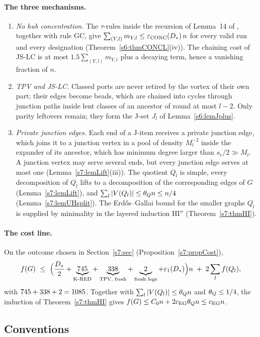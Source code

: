 \paragraph{The three mechanisms.}
\begin{enumerate}
\item[(a)] \emph{No hub concentration.} The $\tau$-rules inside the recursion of
Lemma~14 of \cite{BM}, together with rule GC, give
$\sum_{(Y,l)}m_{Y,l}\le\varepsilon_{\mathrm{CONC}}(D_{*})\,n$ for every valid run and every
designation (Theorem~\ref{s6:thmCONCL}(iv)). The chaining cost of JS-LC is at
most $1.5\sum_{(Y,l)}m_{Y,l}$ plus a decaying term, hence a vanishing fraction
of $n$.
\item[(b)] \emph{TPV and JS-LC.} Classed ports are never retired by the vortex
of their own part; their edges become beads, which are chained into cycles
through junction paths inside lent classes of an ancestor of round at most
$l-2$. Only parity leftovers remain; they form the J-set $J_l$ of
Lemma~\ref{s6:lemJplus}.
\item[(c)] \emph{Private junction edges.} Each end of a J-item receives a
private junction edge, which joins it to a junction vertex in a pool of density
$M_l^{-2}$ inside the expander of its ancestor, which has minimum degree larger
than $s_r/2\gg M_l$. A junction vertex may serve several ends, but every
junction edge serves at most one (Lemma~\ref{s7:lemLift}(iii)). The quotient
$Q_l$ is simple, every decomposition of $Q_l$ lifts to a decomposition of the
corresponding edges of $G$ (Lemma~\ref{s7:lemLift}), and
$\sum_l|V(Q_l)|\le\theta_{Q} n\le n/4$ (Lemma~\ref{s7:lemUHsplit}). The
Erd\H{o}s--Gallai bound for the smaller graphs $Q_l$ is supplied by minimality in
the layered induction HI$''$ (Theorem~\ref{s7:thmHI}).
\end{enumerate}

\paragraph{The cost line.} On the outcome chosen in Section~\ref{s7:sec}
(Proposition~\ref{s7:propCost}),
\[
\f(G)\ \le\ \Bigl(\frac{\Dstar}{2}+\underbrace{\cKRED}_{\text{K-RED}}
+\underbrace{\cFresh}_{\text{TPV, fresh}}+\underbrace{2}_{\text{fresh legs}}
+\epsOne(\Dstar)\Bigr)n\;+\;2\sum_{l}\f(Q_l),
\]
with $745+338+2=1085$. Together with $\sum_l|V(Q_l)|\le\theta_{Q} n$ and
$\theta_{Q}\le1/4$, the induction of Theorem~\ref{s7:thmHI} gives
$f(G)\le C_{0} n+2c_{\mathrm{EG}}\theta_{Q} n\le c_{\mathrm{EG}} n$.

\subsection{Conventions}\label{s1:ssecConv}

